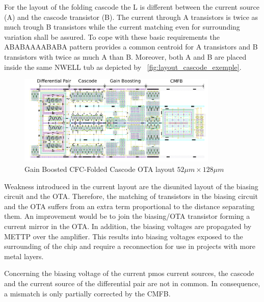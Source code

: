 For the layout of the folding cascode the L is different between the current source (A) and the cascode transistor (B). The current through A transistors is twice as much trough B transistors while the current matching even for surrounding variation shall be assured. To cope with these basic requirements the ABABAAAABABA pattern provides a common centroid for A transistors and B transistors with twice as much A than B. Moreover, both A and B are placed inside the same NWELL tub as depicted by \figurename~\ref{fig:layout_cascode_exemple}.

\begin{figure}[htp]
    \centering
    \includegraphics[width=0.85\textwidth]{Chapter7/Figs/layout_ota_v2.png}
    \caption{Gain Boosted CFC-Folded Cascode OTA layout \(52 \mu m \times 128 \mu m\)}
    \label{fig:Gain-Boosted-CFC-Folded-Cascode-OTA-layout}
\end{figure}

Weakness introduced in the current layout are the disunited layout of the biasing circuit and the OTA\@. Therefore, the matching of transistors in the biasing circuit and the OTA suffers from an extra term proportional to the distance separating them. An improvement would be to join the biasing/OTA transistor forming a current mirror in the OTA\@. In addition, the biasing voltages are propagated by METTP over the amplifier. This results into biasing voltages exposed to the surrounding of the chip and require a reconnection for use in projects with more metal layers.

Concerning the biasing voltage of the current pmos current sources, the cascode and the current source of the differential pair are not in common. In consequence, a mismatch is only partially corrected by the CMFB\@.

